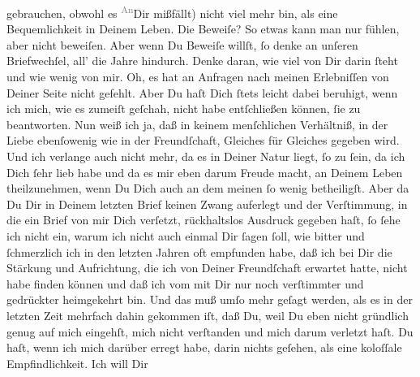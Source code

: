                gebrauchen,  obwohl es \substVorne{}\textsuperscript{\textcolor{gray}{An}}\substDazwischen{}Dir\substHinten{} mißfällt) nicht viel mehr bin, als eine Bequemlichkeit in Deinem Leben. Die
               Beweiſe? So etwas kann man nur fühlen, aber nicht beweiſen. Aber wenn Du Beweiſe
               willſt,{ }ſo denke an unſeren Briefwechſel, all’ die Jahre hindurch. Denke {\pb}daran, wie viel von Dir darin{ }ſteht und wie wenig
               von mir. Oh, es hat an Anfragen nach meinen Erlebniſſen von Deiner Seite nicht
               gefehlt. Aber Du haſt Dich{ }ſtets leicht dabei beruhigt, wenn ich mich, wie es zumeiſt
               geſchah, nicht habe entſchließen können,{ }ſie zu beantworten. Nun weiß ich ja, daß in
               keinem menſchlichen Verhältniß, in der Liebe ebenſowenig wie in der Freundſchaft,
               Gleiches für Gleiches gegeben wird. Und ich verlange auch nicht mehr, da es in Deiner
               Natur liegt,{ }ſo zu{ }ſein, da ich Dich{ }ſehr lieb habe und da es mir eben darum Freude
               macht, an Deinem Leben theilzunehmen, wenn Du Dich auch an dem meinen{ }ſo wenig
               betheiligſt. Aber da Du Dir in Deinem letzten Brief keinen Zwang auferlegt und der
               Verſtimmung, in die ein Brief von mir Dich verſetzt, rückhaltslos Ausdruck gegeben
               haſt,{ }ſo{ }ſehe ich nicht ein, warum ich nicht auch einmal Dir{ }ſagen{ }ſoll, wie bitter
               und{ }ſchmerzlich \strikeout{\textcolor{gray}{h}} ich in den letzten Jahren oft  empfunden
               habe, daß {\pb}ich bei Dir die Stärkung und Aufrichtung,
               die ich von Deiner Freundſchaft erwartet hatte, nicht habe finden können und daß ich
               vom \label{K_L03194-2v}\label{K_L03194-2} mit Dir nur noch
               verſtimmter und gedrückter heimgekehrt bin. Und das muß umſo mehr geſagt werden, als
               es in der letzten Zeit mehrfach dahin gekommen iſt, daß Du, weil Du eben nicht
               gründlich genug auf mich eingehſt, mich \strikeout{\textcolor{gray}{×}\-\textcolor{gray}{×}} nicht verſtanden und mich darum verletzt haſt. Du haſt, wenn ich mich darüber
               erregt habe, darin nichts geſehen, als eine koloſſale Empfindlichkeit. Ich will Dir
